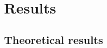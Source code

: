 \documentclass{article}
\newcommand{\PP}{\mathbb{P}}           %
\providecommand{\mc}[1]{\mathcal{#1}}
\begin{document}



\section{Results}

\subsection{Theoretical results} %
\label{sub:theoretical_results}
\end{document}
